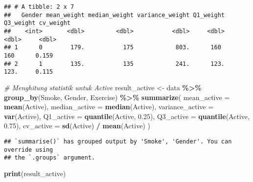 \documentclass[
]{article}
\newenvironment{Shaded}{\begin{snugshade}}{\end{snugshade}}
\newcommand{\AttributeTok}[1]{\textcolor[rgb]{0.13,0.29,0.53}{#1}}
\newcommand{\CommentTok}[1]{\textcolor[rgb]{0.56,0.35,0.01}{\textit{#1}}}
\newcommand{\FloatTok}[1]{\textcolor[rgb]{0.00,0.00,0.81}{#1}}
\newcommand{\FunctionTok}[1]{\textcolor[rgb]{0.13,0.29,0.53}{\textbf{#1}}}
\newcommand{\NormalTok}[1]{#1}
\newcommand{\OtherTok}[1]{\textcolor[rgb]{0.56,0.35,0.01}{#1}}
\newcommand{\SpecialCharTok}[1]{\textcolor[rgb]{0.81,0.36,0.00}{\textbf{#1}}}
\begin{document}
\begin{verbatim}
## # A tibble: 2 x 7
##   Gender mean_weight median_weight variance_weight Q1_weight Q3_weight cv_weight
##    <int>       <dbl>         <dbl>           <dbl>     <dbl>     <dbl>     <dbl>
## 1      0        179.           175            803.      160       160      0.159
## 2      1        135.           135            241.      123.      123.     0.115
\end{verbatim}

\begin{Shaded}
\begin{Highlighting}[]
\CommentTok{\# Menghitung statistik untuk Active }
\NormalTok{result\_active }\OtherTok{\textless{}{-}}\NormalTok{ data }\SpecialCharTok{\%\textgreater{}\%}
  \FunctionTok{group\_by}\NormalTok{(Smoke, Gender, Exercise) }\SpecialCharTok{\%\textgreater{}\%}
  \FunctionTok{summarize}\NormalTok{(}
    \AttributeTok{mean\_active =} \FunctionTok{mean}\NormalTok{(Active),}
    \AttributeTok{median\_active =} \FunctionTok{median}\NormalTok{(Active),}
    \AttributeTok{variance\_active =} \FunctionTok{var}\NormalTok{(Active),}
    \AttributeTok{Q1\_active =} \FunctionTok{quantile}\NormalTok{(Active, }\FloatTok{0.25}\NormalTok{),}
    \AttributeTok{Q3\_active =} \FunctionTok{quantile}\NormalTok{(Active, }\FloatTok{0.75}\NormalTok{),}
    \AttributeTok{cv\_active =} \FunctionTok{sd}\NormalTok{(Active) }\SpecialCharTok{/} \FunctionTok{mean}\NormalTok{(Active)}
\NormalTok{  )}
\end{Highlighting}
\end{Shaded}

\begin{verbatim}
## `summarise()` has grouped output by 'Smoke', 'Gender'. You can override using
## the `.groups` argument.
\end{verbatim}

\begin{Shaded}
\begin{Highlighting}[]
\FunctionTok{print}\NormalTok{(result\_active)}
\end{Highlighting}
\end{Shaded}
\end{document}
